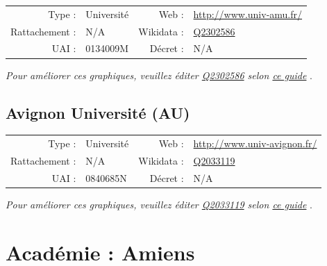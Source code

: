 \documentclass[11pt,french,landscape]{article}
\begin{document}
\begin{tabular*}{0.45\textwidth}{rp{2cm}rl}  
\hline  
Type : & Université & Web : &\href{http://www.univ-amu.fr/}{http://www.univ-amu.fr/} \\  
Rattachement : & N/A & Wikidata : & \href{https://www.wikidata.org/entity/Q2302586}{Q2302586} \\  
UAI : & 0134009M & Décret : & N/A \\  
\hline  
\end{tabular*}

\textit{\scriptsize Pour améliorer ces graphiques, veuillez éditer \href{https://www.wikidata.org/entity/Q2302586}{Q2302586}  selon \href{https://github.com/cpesr/wikidataESR/blob/master/Rmd/wikidataESR.md}{ce guide}}
.


\newpage

\hypertarget{avignon-universituxe9-au}{%
\subsection{Avignon Université (AU)}\label{avignon-universituxe9-au}}

\begin{tabular*}{0.45\textwidth}{rp{2cm}rl}  
\hline  
Type : & Université & Web : &\href{http://www.univ-avignon.fr/}{http://www.univ-avignon.fr/} \\  
Rattachement : & N/A & Wikidata : & \href{https://www.wikidata.org/entity/Q2033119}{Q2033119} \\  
UAI : & 0840685N & Décret : & N/A \\  
\hline  
\end{tabular*}

\textit{\scriptsize Pour améliorer ces graphiques, veuillez éditer \href{https://www.wikidata.org/entity/Q2033119}{Q2033119}  selon \href{https://github.com/cpesr/wikidataESR/blob/master/Rmd/wikidataESR.md}{ce guide}}
.


\newpage

\hypertarget{acaduxe9mie-amiens}{%
\section{Académie : Amiens}\label{acaduxe9mie-amiens}}
\end{document}
